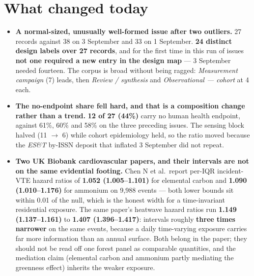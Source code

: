 \documentclass[10pt]{article}
\begin{document}
\section*{\sffamily\bfseries\color{Deep}What changed today}
\vspace{-1.5mm}{\color{Amber}\rule{\linewidth}{1.1pt}}\vspace{2.5mm}

\footnotesize
\begin{itemize}
\item \textbf{A normal-sized, unusually well-formed issue after two outliers.} 27 records
against 38 on 3 September and 33 on 1 September. \textbf{24 distinct design labels over 27
records}, and for the first time in this run of issues \textbf{not one required a new entry
in the design map} --- 3 September needed fourteen. The corpus is broad without being
ragged: \textit{Measurement campaign} (7) leads, then \textit{Review / synthesis} and
\textit{Observational --- cohort} at 4 each.

\item \textbf{The no-endpoint share fell hard, and that is a composition change rather than
a trend.} \textbf{12 of 27 (44\%)} carry no human health endpoint, against 61\%, 60\% and
58\% on the three preceding issues. The sensing block halved (11 $\rightarrow$ 6) while
cohort epidemiology held, so the ratio moved because the \textit{ES\&T} by-ISSN deposit
that inflated 3 September did not repeat.

\item \textbf{Two UK Biobank cardiovascular papers, and their intervals are not on the same
evidential footing.} Chen N et al.\ report per-IQR incident-VTE hazard ratios of
\textbf{1.052 (1.005--1.101)} for elemental carbon and \textbf{1.090 (1.010--1.176)} for
ammonium on 9{,}988 events --- both lower bounds sit within 0.01 of the null, which is the
honest width for a time-invariant residential exposure. The same paper's heatwave hazard
ratios run \textbf{1.149 (1.137--1.161)} to \textbf{1.407 (1.396--1.417)}: intervals
roughly \textbf{three times narrower} on the same events, because a daily time-varying
exposure carries far more information than an annual surface. Both belong in the paper;
they should not be read off one forest panel as comparable quantities, and the mediation
claim (elemental carbon and ammonium partly mediating the greenness effect) inherits the
weaker exposure.


\end{itemize}
\end{document}
